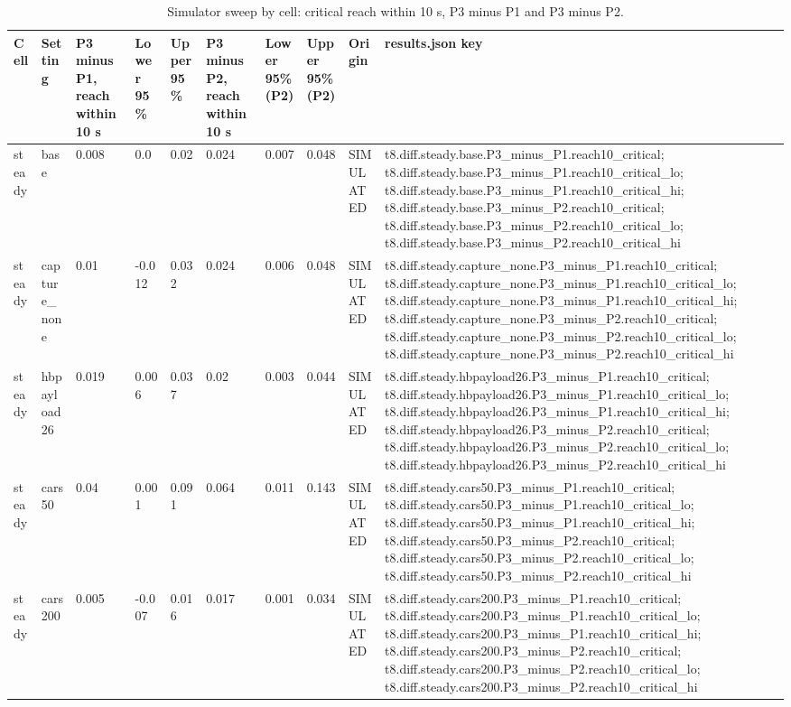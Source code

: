 \begin{table}[t]
\centering
\small
\caption{Simulator sweep by cell: critical reach within 10 s, P3 minus P1 and P3 minus P2.}
\label{tab:tab_sweep_cells}
\begin{tabular}{llllllllll}
\toprule
Cell & Setting & P3 minus P1, reach within 10 s & Lower 95\% & Upper 95\% & P3 minus P2, reach within 10 s & Lower 95\% (P2) & Upper 95\% (P2) & Origin & results.json key \\
\midrule
steady & base & 0.008 & 0.0 & 0.02 & 0.024 & 0.007 & 0.048 & SIMULATED & t8.diff.steady.base.P3\_minus\_P1.reach10\_critical; t8.diff.steady.base.P3\_minus\_P1.reach10\_critical\_lo; t8.diff.steady.base.P3\_minus\_P1.reach10\_critical\_hi; t8.diff.steady.base.P3\_minus\_P2.reach10\_critical; t8.diff.steady.base.P3\_minus\_P2.reach10\_critical\_lo; t8.diff.steady.base.P3\_minus\_P2.reach10\_critical\_hi \\
steady & capture\_none & 0.01 & -0.012 & 0.032 & 0.024 & 0.006 & 0.048 & SIMULATED & t8.diff.steady.capture\_none.P3\_minus\_P1.reach10\_critical; t8.diff.steady.capture\_none.P3\_minus\_P1.reach10\_critical\_lo; t8.diff.steady.capture\_none.P3\_minus\_P1.reach10\_critical\_hi; t8.diff.steady.capture\_none.P3\_minus\_P2.reach10\_critical; t8.diff.steady.capture\_none.P3\_minus\_P2.reach10\_critical\_lo; t8.diff.steady.capture\_none.P3\_minus\_P2.reach10\_critical\_hi \\
steady & hbpayload26 & 0.019 & 0.006 & 0.037 & 0.02 & 0.003 & 0.044 & SIMULATED & t8.diff.steady.hbpayload26.P3\_minus\_P1.reach10\_critical; t8.diff.steady.hbpayload26.P3\_minus\_P1.reach10\_critical\_lo; t8.diff.steady.hbpayload26.P3\_minus\_P1.reach10\_critical\_hi; t8.diff.steady.hbpayload26.P3\_minus\_P2.reach10\_critical; t8.diff.steady.hbpayload26.P3\_minus\_P2.reach10\_critical\_lo; t8.diff.steady.hbpayload26.P3\_minus\_P2.reach10\_critical\_hi \\
steady & cars50 & 0.04 & 0.001 & 0.091 & 0.064 & 0.011 & 0.143 & SIMULATED & t8.diff.steady.cars50.P3\_minus\_P1.reach10\_critical; t8.diff.steady.cars50.P3\_minus\_P1.reach10\_critical\_lo; t8.diff.steady.cars50.P3\_minus\_P1.reach10\_critical\_hi; t8.diff.steady.cars50.P3\_minus\_P2.reach10\_critical; t8.diff.steady.cars50.P3\_minus\_P2.reach10\_critical\_lo; t8.diff.steady.cars50.P3\_minus\_P2.reach10\_critical\_hi \\
steady & cars200 & 0.005 & -0.007 & 0.016 & 0.017 & 0.001 & 0.034 & SIMULATED & t8.diff.steady.cars200.P3\_minus\_P1.reach10\_critical; t8.diff.steady.cars200.P3\_minus\_P1.reach10\_critical\_lo; t8.diff.steady.cars200.P3\_minus\_P1.reach10\_critical\_hi; t8.diff.steady.cars200.P3\_minus\_P2.reach10\_critical; t8.diff.steady.cars200.P3\_minus\_P2.reach10\_critical\_lo; t8.diff.steady.cars200.P3\_minus\_P2.reach10\_critical\_hi \\

\end{tabular}
\end{table}
